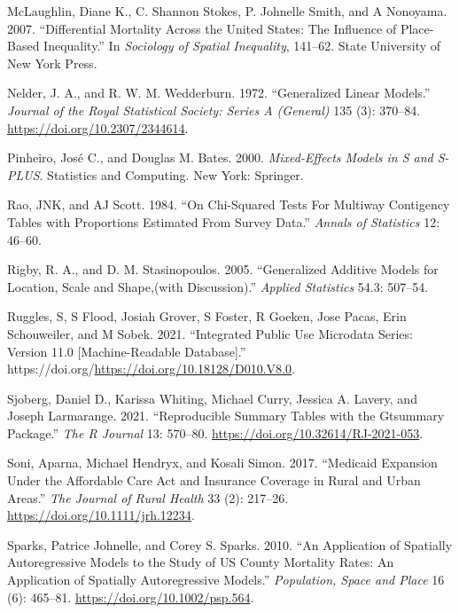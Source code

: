 \documentclass[
  letterpaper,
  DIV=11,
  numbers=noendperiod]{scrreprt}
\newlength{\cslhangindent}
\newlength{\cslentryspacingunit} %
\newenvironment{CSLReferences}[2] %
 {%
  \setlength{\parindent}{0pt}
  \ifodd #1
  \let\oldpar\par
  \def\par{\hangindent=\cslhangindent\oldpar}
  \fi
  \setlength{\parskip}{#2\cslentryspacingunit}
 }%
 {}
\begin{document}
\begin{CSLReferences}{1}{0}
\leavevmode{}%
McLaughlin, Diane K., C. Shannon Stokes, P. Johnelle Smith, and A
Nonoyama. 2007. {``Differential Mortality Across the {United} {States}:
The Influence of Place-Based Inequality.''} In \emph{Sociology of
{Spatial} {Inequality}}, 141--62. State University of New York Press.

\leavevmode{}%
Nelder, J. A., and R. W. M. Wedderburn. 1972. {``Generalized {Linear}
{Models}.''} \emph{Journal of the Royal Statistical Society: Series A
(General)} 135 (3): 370--84. \url{https://doi.org/10.2307/2344614}.

\leavevmode{}%
Pinheiro, José C., and Douglas M. Bates. 2000. \emph{Mixed-Effects
Models in {S} and {S}-{PLUS}}. Statistics and Computing. New York:
Springer.

\leavevmode{}%
Rao, JNK, and AJ Scott. 1984. {``On {Chi}-Squared {Tests} {For}
{Multiway} {Contigency} {Tables} with {Proportions} {Estimated} {From}
{Survey} {Data}.''} \emph{Annals of Statistics} 12: 46--60.

\leavevmode{}%
Rigby, R. A., and D. M. Stasinopoulos. 2005. {``Generalized Additive
Models for Location, Scale and Shape,(with Discussion).''} \emph{Applied
Statistics} 54.3: 507--54.

\leavevmode{}%
Ruggles, S, S Flood, Josiah Grover, S Foster, R Goeken, Jose Pacas, Erin
Schouweiler, and M Sobek. 2021. {``Integrated {Public} {Use} {Microdata}
{Series}: {Version} 11.0 {[}Machine-Readable Database{]}.''}
https://doi.org/\url{https://doi.org/10.18128/D010.V8.0}.

\leavevmode{}%
Sjoberg, Daniel D., Karissa Whiting, Michael Curry, Jessica A. Lavery,
and Joseph Larmarange. 2021. {``Reproducible Summary Tables with the
Gtsummary Package.''} \emph{{The R Journal}} 13: 570--80.
\url{https://doi.org/10.32614/RJ-2021-053}.

\leavevmode{}%
Soni, Aparna, Michael Hendryx, and Kosali Simon. 2017. {``Medicaid
Expansion Under the Affordable Care Act and Insurance Coverage in Rural
and Urban Areas.''} \emph{The Journal of Rural Health} 33 (2): 217--26.
\url{https://doi.org/10.1111/jrh.12234}.

\leavevmode{}%
Sparks, Patrice Johnelle, and Corey S. Sparks. 2010. {``An Application
of Spatially Autoregressive Models to the Study of {US} County Mortality
Rates: {An} {Application} of {Spatially} {Autoregressive} {Models}.''}
\emph{Population, Space and Place} 16 (6): 465--81.
\url{https://doi.org/10.1002/psp.564}.


\end{CSLReferences}
\end{document}
